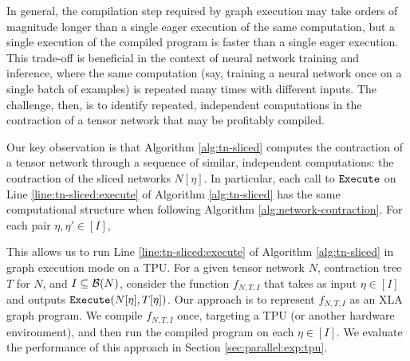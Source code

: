 In general, the compilation step required by graph execution may take orders of magnitude longer than a single eager execution of the same computation, but a single execution of the compiled program is faster than a single eager execution. 
This trade-off is beneficial in the context of neural network training and inference, where the same computation (say, training a neural network once on a single batch of examples) is repeated many times with different inputs.
The challenge, then, is to identify repeated, independent computations in the contraction of a tensor network that may be profitably compiled.

Our key observation is that Algorithm \ref{alg:tn-sliced} computes the contraction of a tensor network through a sequence of similar, independent computations: the contraction of the sliced networks $N[\eta]$. In particular, each call to $\texttt{\upshape Execute}$ on Line \ref{line:tn-sliced:execute} of Algorithm \ref{alg:tn-sliced} has the same computational structure when following Algorithm \ref{alg:network-contraction}. For each pair $\eta, \eta' \in [I]$, 

This allows us to run Line \ref{line:tn-sliced:execute} of Algorithm \ref{alg:tn-sliced} in graph execution mode on a TPU.
For a given tensor network $N$, contraction tree $T$ for $N$, and $I \subseteq \mathcal{B}(N)$, consider the function $f_{N,T,I}$ that takes as input $\eta \in [I]$ and outputs $\texttt{\upshape Execute}(N[\eta], T[\eta])$.
Our approach is to represent $f_{N,T,I}$ as an XLA graph program.
We compile $f_{N,T,I}$ once, targeting a TPU (or another hardware environment), and then run the compiled program on each $\eta \in [I]$.
We evaluate the performance of this approach in Section \ref{sec:parallel:exp:tpu}.

